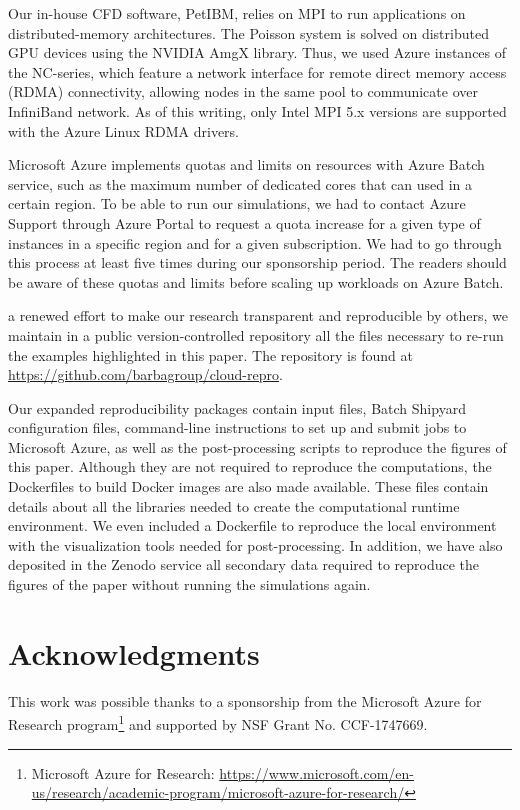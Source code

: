 \documentclass[10pt,journal,compsoc]{IEEEtran}
\begin{document}
Our in-house CFD software, PetIBM, relies on MPI to run applications on distributed-memory architectures.
The Poisson system is solved on distributed GPU devices using the NVIDIA AmgX library.
Thus, we used Azure instances of the NC-series, which feature a network interface for remote direct memory access (RDMA) connectivity, allowing nodes in the same pool to communicate over InfiniBand network.
As of this writing, only Intel MPI 5.x versions are supported with the Azure Linux RDMA drivers.

Microsoft Azure implements quotas and limits on resources with Azure Batch service, such as the maximum number of dedicated cores that can used in a certain region.
To be able to run our simulations, we had to contact Azure Support through Azure Portal to request a quota increase for a given type of instances in a specific region and for a given subscription.
We had to go through this process at least five times during our sponsorship period.
The readers should be aware of these quotas and limits before scaling up workloads on Azure Batch.

\bigskip
{} a renewed effort to make our research transparent and reproducible by others, we maintain in a public version-controlled repository all the files necessary to re-run the examples highlighted in this paper.
The repository is found at \url{https://github.com/barbagroup/cloud-repro}.

Our expanded reproducibility packages contain input files, Batch Shipyard configuration files, command-line instructions to set up and submit jobs to Microsoft Azure, as well as the post-processing scripts to reproduce the figures of this paper.
Although they are not required to reproduce the computations, the Dockerfiles to build Docker images are also made available. 
These files contain details about all the libraries needed to create the computational runtime environment.
We even included a Dockerfile to reproduce the local environment with the visualization tools needed for post-processing.
In addition, we have also deposited in the Zenodo service all secondary data required to reproduce the figures of the paper without running the simulations again.

\section*{Acknowledgments}

This work was possible thanks to a sponsorship from the Microsoft Azure for Research program\footnote{Microsoft Azure for Research: \url{https://www.microsoft.com/en-us/research/academic-program/microsoft-azure-for-research/}} and supported by NSF Grant No. CCF-1747669.



%
\end{document}
